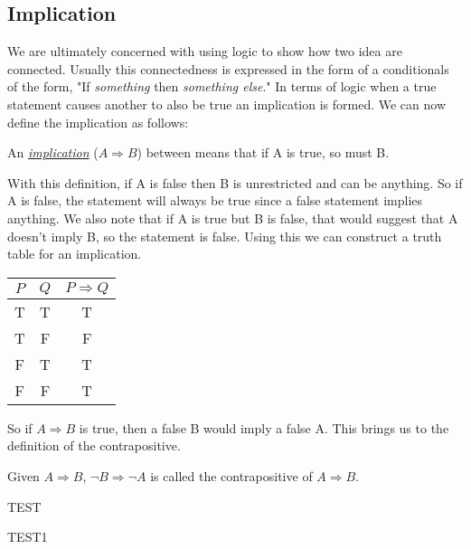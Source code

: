 \subsection{Implication}
We are ultimately concerned with using logic to show how two idea are connected.
Usually this connectedness is expressed in the form of a conditionals of the form, "If \emph{something} then \emph{something else}."
In terms of logic when a true statement causes another to also be true an implication is formed.
We can now define the implication as follows:

\begin{defn}
	An \emph{\underline{implication}} ($A \Rightarrow B$) between means that if A is true, so must B.
\end{defn}
With this definition, if A is false then B is unrestricted and can be anything.
So if A is false, the statement will always be true since a false statement implies anything.
We also note that if A is true but B is false, that would suggest that A doesn't imply B, so the statement is false.
Using this we can construct a truth table for an implication.

\begin{center}
	\begin{tabular}{cc|c}
		$P$ & $Q$ & $P \Rightarrow Q$ \\
		\hline
		T & T & T \\
		T & F & F \\
		F & T & T \\
		F & F & T \\
	\end{tabular}
\end{center}

So if $A \Rightarrow B$ is true, then a false B would imply a false A.
This brings us to the definition of the contrapositive.

\begin{defn}
	Given $A \Rightarrow B$, $\neg B \Rightarrow \neg A$ is called the contrapositive of $A \Rightarrow B$.
\end{defn}


\begin{exe}
    TEST
    \begin{soln}
        TEST1
    \end{soln}
\end{exe}
